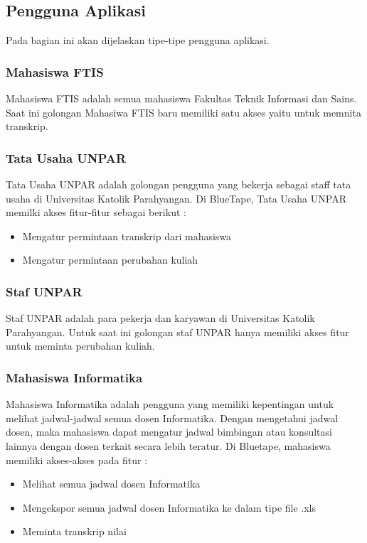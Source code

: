 \subsection{Pengguna Aplikasi}
Pada bagian ini akan dijelaskan tipe-tipe pengguna aplikasi.

\subsubsection{Mahasiswa FTIS}
Mahasiswa FTIS adalah semua mahasiswa Fakultas Teknik Informasi dan Sains. Saat ini golongan Mahasiwa FTIS baru memiliki satu akses yaitu untuk memnita transkrip.


\subsubsection{Tata Usaha UNPAR}
Tata Usaha UNPAR adalah golongan pengguna yang bekerja sebagai staff tata usaha di Universitas Katolik Parahyangan. Di BlueTape, Tata Usaha UNPAR memilki akses fitur-fitur sebagai berikut :
\begin{itemize}
	\item Mengatur permintaan transkrip dari mahasiswa
	\item Mengatur permintaan perubahan kuliah 
\end{itemize}

\subsubsection{Staf UNPAR}
Staf UNPAR adalah para pekerja dan karyawan di Universitas Katolik Parahyangan. Untuk saat ini golongan staf UNPAR hanya memiliki akses fitur untuk meminta perubahan kuliah.

\subsubsection{Mahasiswa Informatika}
Mahasiswa Informatika adalah pengguna yang memiliki kepentingan untuk melihat jadwal-jadwal semua dosen Informatika. Dengan mengetahui jadwal dosen, maka mahasiswa dapat mengatur jadwal bimbingan atau konsultasi lainnya dengan dosen terkait secara lebih teratur. Di Bluetape, mahasiswa memiliki akses-akses pada fitur :
\begin{itemize}
	\item Melihat semua jadwal dosen Informatika
	\item Mengekspor semua jadwal dosen Informatika ke dalam tipe file .xls
	\item Meminta transkrip nilai
\end{itemize}

